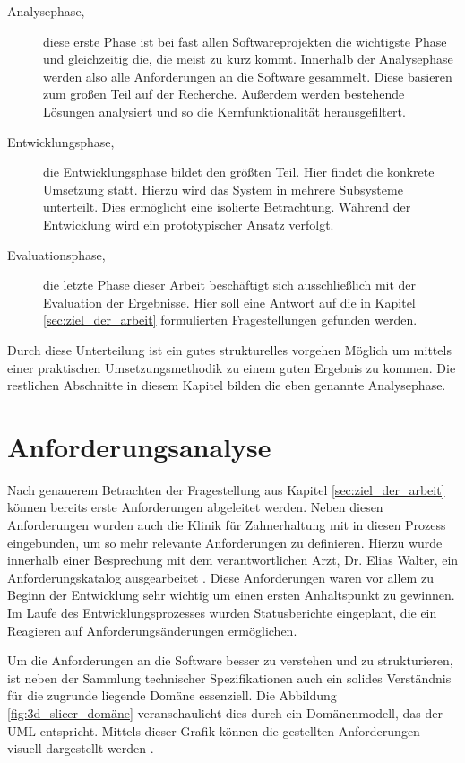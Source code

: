 \begin{description}
	\item[Analysephase,] diese erste Phase ist bei fast allen Softwareprojekten die
		wichtigste Phase und gleichzeitig die, die meist zu kurz kommt. Innerhalb der
		Analysephase werden also alle Anforderungen an die Software gesammelt. Diese
		basieren zum großen Teil auf der Recherche. Außerdem werden bestehende Lösungen
		analysiert und so die Kernfunktionalität herausgefiltert.

	\item[Entwicklungsphase,] die Entwicklungsphase bildet den größten Teil. Hier
		findet die konkrete Umsetzung statt. Hierzu wird das System in mehrere Subsysteme
		unterteilt. Dies ermöglicht eine isolierte Betrachtung. Während der Entwicklung
		wird ein prototypischer Ansatz verfolgt.

	\item[Evaluationsphase,] die letzte Phase dieser Arbeit beschäftigt sich ausschließlich
		mit der Evaluation der Ergebnisse. Hier soll eine Antwort auf die in Kapitel
		\ref{sec:ziel_der_arbeit} formulierten Fragestellungen gefunden werden.
\end{description}

Durch diese Unterteilung ist ein gutes strukturelles vorgehen Möglich um mittels
einer praktischen Umsetzungsmethodik zu einem guten Ergebnis zu kommen. Die
restlichen Abschnitte in diesem Kapitel bilden die eben genannte Analysephase.

\section{Anforderungsanalyse}
\label{sec:anforderungsanalyse} Nach genauerem Betrachten der Fragestellung aus
Kapitel \ref{sec:ziel_der_arbeit} können bereits erste Anforderungen abgeleitet
werden. Neben diesen Anforderungen wurden auch die Klinik für Zahnerhaltung mit in
diesen Prozess eingebunden, um so mehr relevante Anforderungen zu definieren. Hierzu
wurde innerhalb einer Besprechung mit dem verantwortlichen Arzt, Dr. Elias Walter,
ein Anforderungskatalog ausgearbeitet \citep[vgl.][]{walter2025}. Diese
Anforderungen waren vor allem zu Beginn der Entwicklung sehr wichtig um einen
ersten Anhaltspunkt zu gewinnen. Im Laufe des Entwicklungsprozesses wurden Statusberichte
eingeplant, die ein Reagieren auf Anforderungsänderungen ermöglichen.

Um die Anforderungen an die Software besser zu verstehen und zu strukturieren, ist
neben der Sammlung technischer Spezifikationen auch ein solides Verständnis für die
zugrunde liegende Domäne essenziell. Die Abbildung \ref{fig:3d_slicer_domäne}
veranschaulicht dies durch ein Domänenmodell, das der \ac{UML} entspricht. Mittels
dieser Grafik können die gestellten Anforderungen visuell dargestellt werden \citep[vgl.][]{walter2025}.

